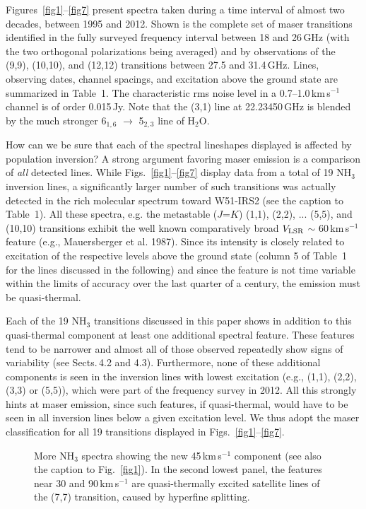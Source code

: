 \documentclass[oldversion]{aa}
\begin{document}
Figures~\ref{fig1}--\ref{fig7} present spectra taken during a 
time interval of almost two decades, between 1995 and 2012. 
Shown is the complete set of maser transitions identified in 
the fully surveyed frequency interval between 18 and 26\,GHz
(with the two orthogonal polarizations being averaged) 
and by observations of the (9,9), (10,10), and (12,12) transitions 
between 27.5 and 31.4\,GHz. Lines, observing dates, channel 
spacings, and excitation above the ground state are summarized 
in Table~1. The characteristic rms noise level in a 
0.7--1.0\,km\,s$^{-1}$ channel is  of order 0.015\,Jy. Note that the 
(3,1) line at 22.23450\,GHz is blended by the much stronger 
6$_{1,6}$ $\rightarrow$ 5$_{2,3}$ line of H$_2$O. 

How can we be sure that each of the spectral lineshapes displayed 
is affected by population inversion? A strong argument favoring 
maser emission is a comparison of {\it all} detected lines. While 
Figs.~\ref{fig1}--\ref{fig7} display data from a total of 
19 NH$_3$ inversion lines, a significantly larger number
of such transitions was actually detected in the rich molecular
spectrum toward W51-IRS2 (see the caption to Table~1). All 
these spectra, e.g. the metastable ($J$=$K$) (1,1), (2,2), ... 
(5,5), and (10,10) transitions exhibit the well known comparatively 
broad $V_{\rm LSR}$ $\sim$ 60\,km\,s$^{-1}$ feature (e.g., 
Mauersberger et al. 1987). Since its intensity is closely related 
to excitation of the respective levels above the ground state 
(column 5 of Table~1 for the lines discussed in the following) 
and since the feature is not time variable within the limits of 
accuracy over the last quarter of a century, the emission 
must be quasi-thermal. 

Each of the 19 NH$_3$ transitions discussed in this paper shows
in addition to this quasi-thermal component at least one
additional spectral feature. These features tend to be narrower 
and almost all of those observed repeatedly show signs of variability
(see Sects.\,4.2 and 4.3). Furthermore, none of these 
additional components is seen in the inversion lines with 
lowest excitation (e.g., (1,1), (2,2), (3,3) or (5,5)), which 
were part of the frequency survey in 2012. All this strongly 
hints at maser emission, since such features, if quasi-thermal, 
would have to be seen in all inversion lines below a given 
excitation level. We thus adopt the maser classification 
for all 19 transitions displayed in Figs.~\ref{fig1}--\ref{fig7}.


\begin{figure}[t]
\vspace{0.0cm}
\centering
{}
\vspace{-0.7cm}
\caption{More NH$_3$ spectra showing the new 45\,km\,s$^{-1}$ 
component (see also the caption to Fig.~\ref{fig1}). In the second
lowest panel, the features near 30 and 90\,km\,s$^{-1}$ are 
quasi-thermally excited satellite lines of the (7,7) transition, 
caused by hyperfine splitting.  
\label{fig2}}
\end{figure}
\end{document}
